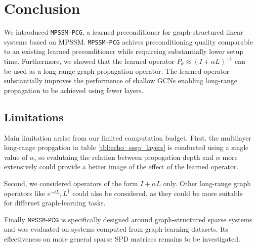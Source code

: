 \section{Conclusion}
We introduced \texttt{MPSSM-PCG}, a learned preconditioner for graph-structured
linear systems based on MPSSM. \texttt{MPSSM-PCG} achives preconditioning
quality comparable to an existing learned preconditioner while requireing
substantially lower setup time. Furthermore, we showed that the learned
operator $P_\theta \approx (I + \alpha L)^{-1}$ can be used as a long-range
graph propagation operator. The learned operator substantially improves the
performence of shallow GCNs enabling long-range propagation to be achieved
using fewer layers.

\subsection{Limitations}
Main limitation arrise from our limited computation budget. First, the
multilayer long-range propgation in table \ref{tbl:echo_sssp_layers} is
conducted using a single value of $\alpha$, so evalutaing the relation between
propogation depth and $\alpha$ more extensively could provide a better image of
the effect of the learned operator.

Second, we considered operators of the form $I + \alpha L$ only. Other
long-range graph operators like $e^{-tL}, L^\dagger$ could also be considered,
as they could be more suitable for differnet graph-learning tasks.

Finally $\texttt{MPSSM-PCG}$ is specifically designed around graph-structured
sparse systems and was evaluated on systems computed from graph-learning
datasets. Its effectiveness on more general sparse SPD matrices remains to be
investigated.

